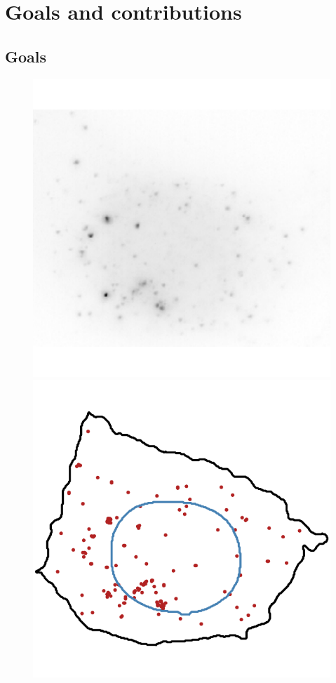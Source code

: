 \section{Goals and contributions}
\label{sec:contributions}

\subsection{Goals}
\label{subsec:intro_goals}

\begin{figure}[]
	\centering
		\includegraphics[width=0.95\linewidth]{figures/introduction/real_image_foci}
		\vfill
		\includegraphics[width=0.95\linewidth]{figures/introduction/real_coord_foci}

\end{figure}
